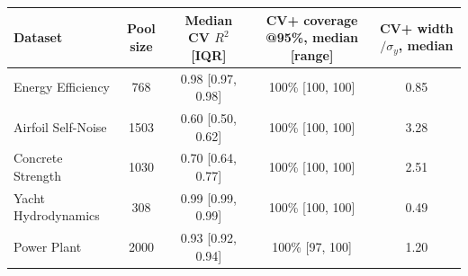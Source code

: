 \begin{tabular}{@{}lcccc@{}}
\toprule
Dataset & Pool size & Median CV $R^2$ [IQR] & CV+ coverage @95\%, median [range] & CV+ width$/\sigma_y$, median \\
\midrule
Energy Efficiency \cite{tsanasAccurateQuantitativeEstimation2012} & 768 & 0.98 [0.97, 0.98] & 100\% [100, 100] & 0.85 \\
Airfoil Self-Noise \cite{brooksAirfoilSelfnoisePrediction1989} & 1503 & 0.60 [0.50, 0.62] & 100\% [100, 100] & 3.28 \\
Concrete Strength \cite{yehModelingStrengthHigh1998} & 1030 & 0.70 [0.64, 0.77] & 100\% [100, 100] & 2.51 \\
Yacht Hydrodynamics \cite{gerritsmaGeometryResistanceStability1981} & 308 & 0.99 [0.99, 0.99] & 100\% [100, 100] & 0.49 \\
Power Plant \cite{tufekciPredictionFullLoad2014} & 2000 & 0.93 [0.92, 0.94] & 100\% [97, 100] & 1.20 \\
\bottomrule
\end{tabular}
